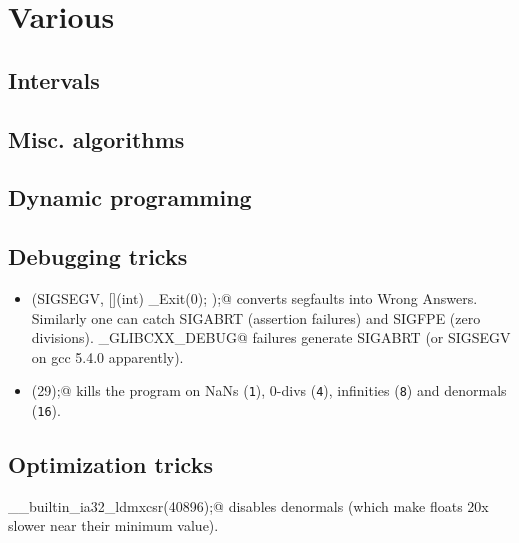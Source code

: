 \chapter{Various}

\section{Intervals}

\section{Misc. algorithms}

\section{Dynamic programming}

\section{Debugging tricks}
	\begin{itemize}
		\item \verb@signal(SIGSEGV, [](int) { _Exit(0); });@ converts segfaults into Wrong Answers.
			Similarly one can catch SIGABRT (assertion failures) and SIGFPE (zero divisions).
			\verb@_GLIBCXX_DEBUG@ failures generate SIGABRT (or SIGSEGV on gcc 5.4.0 apparently).
		\item \verb@feenableexcept(29);@ kills the program on NaNs (\texttt 1), 0-divs (\texttt 4), infinities (\texttt 8) and denormals (\texttt{16}).
	\end{itemize}



\section{Optimization tricks}
	\verb@__builtin_ia32_ldmxcsr(40896);@ disables denormals (which make floats 20x slower near their minimum value).
